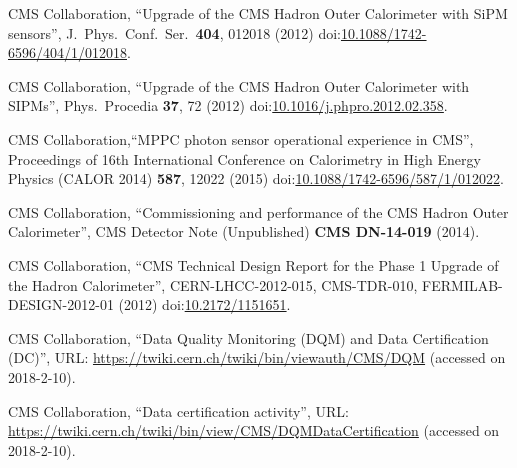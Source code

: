 \begin{thebibliography}{99}


CMS Collaboration, ``Upgrade of the CMS Hadron Outer Calorimeter with SiPM sensors'', J.\ Phys.\ Conf.\ Ser.\ {\bf 404}, 012018 (2012) doi:\href{}{10.1088/1742-6596/404/1/012018}.

CMS Collaboration, ``Upgrade of the CMS Hadron Outer Calorimeter with SIPMs'', Phys.\ Procedia {\bf 37}, 72 (2012) doi:\href{http://dx.doi.org/10.1016/j.phpro.2012.02.358}{10.1016/j.phpro.2012.02.358}.

 CMS Collaboration,``MPPC photon sensor operational experience in CMS'', Proceedings of 16th International Conference on Calorimetry in High Energy Physics (CALOR 2014) {\bf 587}, 12022 (2015) doi:\href{}{10.1088/1742-6596/587/1/012022}.

CMS Collaboration, ``Commissioning and performance of the CMS Hadron Outer Calorimeter'', CMS Detector Note (Unpublished) {\bf CMS DN-14-019} (2014).

CMS Collaboration, ``CMS Technical Design Report for the Phase 1 Upgrade of the Hadron Calorimeter'', CERN-LHCC-2012-015, CMS-TDR-010, FERMILAB-DESIGN-2012-01 (2012) doi:\href{http://dx.doi.org/10.2172/1151651}{10.2172/1151651}.

CMS Collaboration, ``Data Quality Monitoring (DQM) and Data Certification (DC)'', URL: \url{https://twiki.cern.ch/twiki/bin/viewauth/CMS/DQM} (accessed on 2018-2-10).

CMS Collaboration, ``Data certification activity'', URL: \url{https://twiki.cern.ch/twiki/bin/view/CMS/DQMDataCertification} (accessed on 2018-2-10).

\end{thebibliography}

